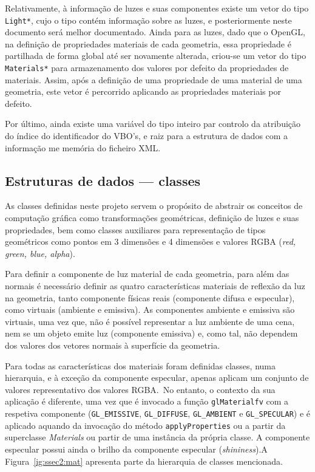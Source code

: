 Relativamente, à informação de luzes e suas componentes existe um vetor do tipo
\texttt{Light*}, cujo o tipo contém informação sobre as luzes, e posteriormente
neste documento será melhor documentado. Ainda para as luzes, dado que o OpenGL,
na definição de propriedades materiais de cada geometria, essa propriedade
é partilhada de forma global até ser novamente alterada, criou-se um vetor do
tipo \texttt{Materials*} para armazenamento dos valores por defeito da
propriedades de materiais. Assim, após a definição de uma propriedade de uma
material de uma geometria, este vetor é percorrido aplicando as propriedades
materiais por defeito.

Por último, ainda existe uma variável do tipo inteiro par controlo da atribuição
do índice do identificador do VBO's, e raiz para a estrutura de dados com
a informação me memória do ficheiro XML.\ 


\subsection{Estruturas de dados --- classes}

As classes definidas neste projeto servem o propósito de abstrair os conceitos
de computação gráfica como transformações geométricas, definição de luzes e suas
propriedades, bem como classes auxiliares para representação de tipos
geométricos como pontos em 3 dimensões e 4 dimensões e valores RGBA (\emph{red,
green, blue, alpha}).


Para definir a componente de luz material de cada geometria, para além das
normais é necessário definir as quatro características materiais de reflexão da
luz na geometria, tanto componente físicas reais (componente difusa
e especular), como virtuais (ambiente e emissiva). As componentes ambiente
e emissiva são virtuais, uma vez que, não é possível representar a luz ambiente
de uma cena, nem se um objeto emite luz (componente emissiva) e, como tal, não
dependem dos valores dos vetores normais à superfície da geometria.

Para todas as características dos materiais foram definidas classes, numa
hierarquia, e à exceção da componente especular, apenas aplicam um conjunto de
valores representativo dos valores RGBA.\ No entanto, o contexto da sua aplicação
é diferente, uma vez que é invocado a função \texttt{glMaterialfv} com
a respetiva componente (\texttt{GL\_EMISSIVE}, \texttt{GL\_DIFFUSE},
\texttt{GL\_AMBIENT} e \texttt{GL\_SPECULAR}) e é aplicado aquando da invocação
do método \texttt{applyProperties} ou a partir da superclasse \emph{Materials}
ou partir de uma instância da própria classe. A componente especular possui
ainda o brilho da componente especular (\emph{shininess}).A Figura~\ref{ig:ssec2:mat}
apresenta parte da hierarquia de classes mencionada.


